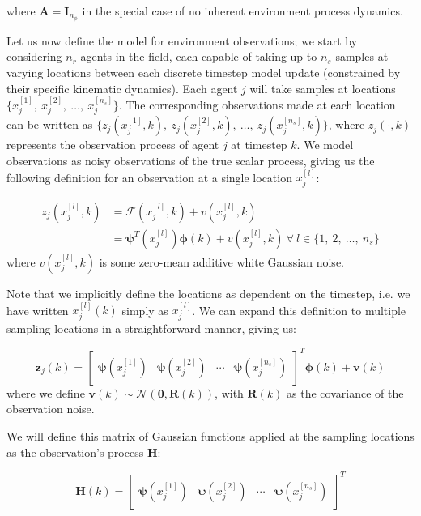 where $\mathbf{A}=\mathbf{I}_{n_{\phi}}$ in the special case of no inherent environment process dynamics.

Let us now define the model for environment observations; we start by considering $n_r$ agents in the field, each capable of taking up to $n_s$ samples at varying locations between each discrete timestep model update (constrained by their specific kinematic dynamics). Each agent $j$ will take samples at locations $\{x_j^{[1]},\ x_j^{[2]},\ \hdots,\ x_j^{[n_s]}\}$. The corresponding observations made at each location can be written as $\{z_j(x_j^{[1]},k),\ z_j(x_j^{[2]},k),\ \hdots,\ z_j(x_j^{[n_s]},k)\}$, where $z_j(\cdot, k)$ represents the observation process of agent $j$ at timestep $k$. We model observations as noisy observations of the true scalar process, giving us the following definition for an observation at a single location $x_j^{[l]}$:

\begin{align}
    z_j(x_j^{[l]},k) &= \mathcal{F}(x_j^{[l]},k) + v(x_j^{[l]}, k) \\
    &= \bm{\psi}^T(x_j^{[l]})\bm{\phi}(k) + v(x_j^{[l]}, k) \ \forall\ l\in\{1,\ 2,\ \hdots,\ n_s\}
    \label{eq:indv-agent-single-loc-obs-model}
\end{align}
where $v(x_j^{[l]}, k)$ is some zero-mean additive white Gaussian noise.

Note that we implicitly define the locations as dependent on the timestep, i.e. we have written $x_j^{[l]}(k)$ simply as $x_j^{[l]}$. We can expand this definition to multiple sampling locations in a straightforward manner, giving us:

\begin{equation}
    \mathbf{z}_j(k) = \begin{bmatrix} \bm{\psi}(x_j^{[1]}) & \bm{\psi}(x_j^{[2]}) & \cdots & \bm{\psi}(x_j^{[n_s]})\end{bmatrix}^T\bm{\phi}(k) + \mathbf{v}(k)
    \label{eq:indv-agent-multi-loc-obs-model}
\end{equation}
where we define $\mathbf{v}(k)\sim\mathcal{N}(\mathbf{0}, \mathbf{R}(k))$, with $\mathbf{R}(k)$ as the covariance of the observation noise.

We will define this matrix of Gaussian functions applied at the sampling locations as the observation's process $\mathbf{H}$:

\begin{equation}
    \mathbf{H}(k) = \begin{bmatrix} \bm{\psi}(x_j^{[1]}) & \bm{\psi}(x_j^{[2]}) & \cdots & \bm{\psi}(x_j^{[n_s]})\end{bmatrix}^T
\end{equation}

